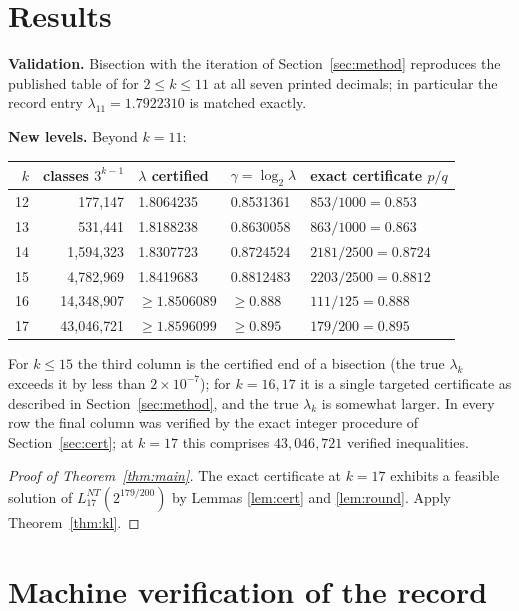 \documentclass[11pt]{article}
\begin{document}
\section{Results}\label{sec:results}

\textbf{Validation.} Bisection with the iteration of
Section~\ref{sec:method} reproduces the published table of
\cite[Table~2]{kl} for $2 \le k \le 11$ at all seven printed decimals;
in particular the record entry $\lambda_{11} = 1.7922310$ is matched
exactly. \medskip

\noindent\textbf{New levels.} Beyond $k = 11$:

\begin{center}
\begin{tabular}{rrlll}
\toprule
$k$ & classes $3^{k-1}$ & $\lambda$ certified & $\gamma = \log_2\lambda$
& exact certificate $p/q$ \\
\midrule
12 & 177{,}147    & 1.8064235 & 0.8531361 & $853/1000 = 0.853$ \\
13 & 531{,}441    & 1.8188238 & 0.8630058 & $863/1000 = 0.863$ \\
14 & 1{,}594{,}323  & 1.8307723 & 0.8724524 & $2181/2500 = 0.8724$ \\
15 & 4{,}782{,}969  & 1.8419683 & 0.8812483 & $2203/2500 = 0.8812$ \\
16 & 14{,}348{,}907 & $\ge 1.8506089$ & $\ge 0.888$ & $111/125 = 0.888$ \\
17 & 43{,}046{,}721 & $\ge 1.8596099$ & $\ge 0.895$ & $179/200 = 0.895$ \\
\bottomrule
\end{tabular}
\end{center}

\noindent
For $k \le 15$ the third column is the certified end of a bisection
(the true $\lambda_k$ exceeds it by less than $2\times 10^{-7}$); for
$k = 16, 17$ it is a single targeted certificate as described in
Section~\ref{sec:method}, and the true $\lambda_k$ is somewhat larger.
In every row the final column was verified by the exact integer
procedure of Section~\ref{sec:cert}; at $k = 17$ this comprises
$43{,}046{,}721$ verified inequalities.

\begin{proof}[Proof of Theorem~\ref{thm:main}]
The exact certificate at $k = 17$ exhibits a feasible solution of
$L_{17}^{NT}(2^{179/200})$ by Lemmas \ref{lem:cert} and
\ref{lem:round}. Apply Theorem~\ref{thm:kl}.
\end{proof}

\section{Machine verification of the record}\label{sec:formal}
\end{document}

